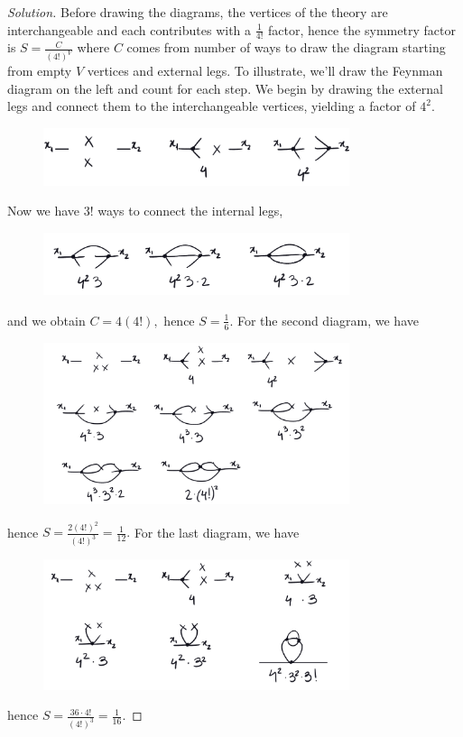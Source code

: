 \begin{proof}[Solution]
   Before drawing the diagrams, the vertices of the theory are interchangeable and each contributes with a \(\frac{1}{4!}\) factor, hence the symmetry factor is \(S = \frac{C}{(4!)^V}\) where \(C\) comes from number of ways to draw the diagram starting from empty \(V\) vertices and external legs. To illustrate, we'll draw the Feynman diagram on the left and count for each step. We begin by drawing the external legs and connect them to the interchangeable vertices, yielding a factor of \(4^2\).
   \begin{figure}[H]
      \centering
      \includegraphics[width=0.8\textwidth]{p2ai.png}
   \end{figure}
   \noindent Now we have \(3!\) ways to connect the internal legs,
   \begin{figure}[H]
      \centering
      \includegraphics[width=0.8\textwidth]{p2ai2.png}
   \end{figure}
   \noindent and we obtain \(C = 4 (4!),\)  hence \(S = \frac16.\) For the second diagram, we have 
   \begin{figure}[H]
      \centering
      \includegraphics[width=0.8\textwidth]{p2aii.png}
   \end{figure}
   \noindent hence \(S = \frac{2(4!)^2}{(4!)^3} = \frac1{12}.\) For the last diagram, we have
   \begin{figure}[H]
      \centering
      \includegraphics[width=0.8\textwidth]{p2aiii.png}
   \end{figure}
   \noindent hence \(S = \frac{36 \cdot 4!}{(4!)^3} = \frac{1}{16}.\)


\end{proof}
